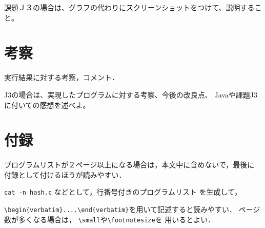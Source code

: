 \documentclass[11pt,a4j]{jarticle}
\begin{document}
課題Ｊ３の場合は、グラフの代わりにスクリーンショットをつけて、説明すること。

\section{考察}
実行結果に対する考察，コメント．

J3の場合は、実現したプログラムに対する考察、今後の改良点、
Javaや課題J3に付いての感想を述べよ。

\section{付録}
プログラムリストが２ページ以上になる場合は，本文中に含めないで，最後に
付録として付けるほうが読みやすい．

\verb|cat -n hash.c| などとして，行番号付きのプログラムリスト
を生成して，

\noindent
\verb|\begin{verbatim}....\end{verbatim}|を用いて記述すると読みやすい．
ページ数が多くなる場合は，
\verb|\small|や\verb|\footnotesize|を
用いるとよい．
\end{document}
